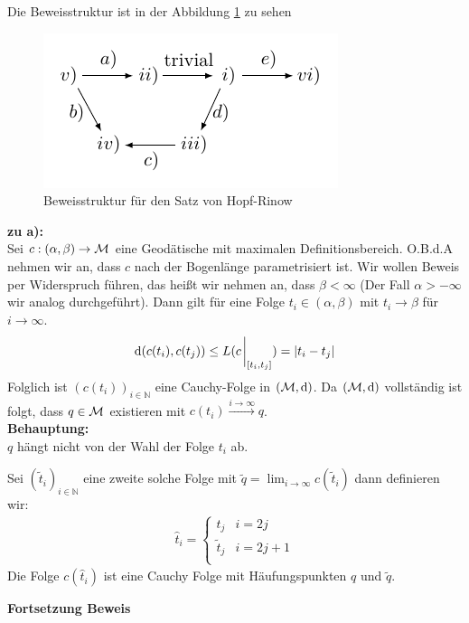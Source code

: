 \begin{bew}
    Die Beweisstruktur ist in der Abbildung \ref{fig:proofhopfrinow} zu sehen
    \begin{figure}[H]
        \centering
        \includegraphics[width=0.5\linewidth]{figures/tikz/proofhopfrinow.pdf}
        \caption{Beweisstruktur für den Satz von Hopf-Rinow}
        \label{fig:proofhopfrinow}
    \end{figure} 


\textbf{zu a):}\\
Sei $c : (\alpha , \beta) \to \mathcal{M}$ eine Geodätische mit maximalen Definitionsbereich.
O.B.d.A nehmen wir an, dass $c$ nach der Bogenlänge parametrisiert ist. 
Wir wollen Beweis per Widerspruch führen, das heißt wir nehmen an, 
dass $\beta < \infty$ (Der Fall $\alpha > - \infty$ wir analog durchgeführt).
Dann gilt für eine Folge $t_i \in (\alpha , \beta)$ mit $t_i \to \beta$ für $i \to \infty$.
\begin{align*}
    \dd (c (t_i), c(t_j)) \leq L (c \eval_{[t_i , t_j ]}) = \abs{t_i - t_j}
\end{align*}
Folglich ist $(c(t_i))_{i \in \mathbb{N}}$ eine Cauchy-Folge in $(\mathcal{M} , \dd)$. 
Da $(\mathcal{M}, \dd)$ vollständig ist folgt, 
dass $q \in \mathcal{M}$ existieren mit $c(t_i) \overset{i \to \infty}{\longrightarrow}q$.\\
\textbf{Behauptung:}\\
$q$ hängt nicht von der Wahl der Folge $t_i$ ab.

\begin{bew}[Behauptung]
Sei $(\tilde{t}_i)_{i \in \mathbb{N}}$ eine zweite solche Folge mit 
$\tilde{q} = \lim_{i\to\infty} c(\tilde{t}_i)$ dann definieren wir:
\begin{align}
    \hat{t}_i = \left\{
\begin{array}{ll}
t_j & i = 2 j \\
\tilde{t}_j & i = 2j + 1 \\
\end{array}
\right.
\end{align}
Die Folge $c(\hat{t}_i)$ ist eine Cauchy Folge mit Häufungspunkten $q$ und $\tilde{q}$.
\end{bew}
\textbf{Fortsetzung Beweis}\\


\end{bew}
